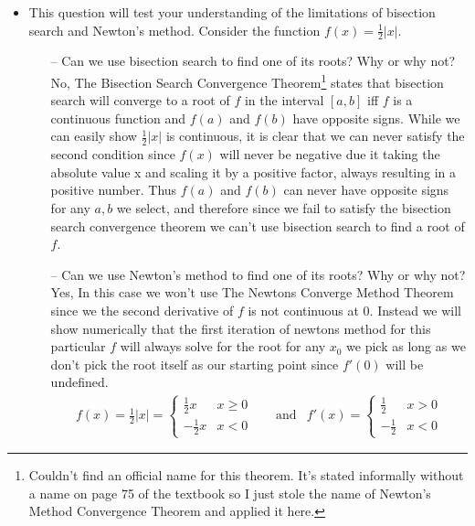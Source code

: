 \documentclass{article}
\begin{document}
\begin{itemize}
    \newpage
    \item This question will test your understanding of the limitations of bisection search and Newton’s method. Consider the function $f(x) = \frac{1}{2}|x|$.
    \begin{itemize}
        \item[--] Can we use bisection search to find one of its roots? Why or why not?
        \newline\newline
        No, The Bisection Search Convergence Theorem\footnote{Couldn't find an official name  for this theorem. It's stated informally without a name on page 75 of the textbook so I just stole the name of Newton's Method Convergence Theorem and applied it here.} states that bisection search will converge to a root of $f$ in the interval $[a, b]$ iff $f$ is a continuous function and $f(a)$ and $f(b)$ have opposite signs. While we can easily show $\frac{1}{2}|x|$ is continuous, it is clear that we can never satisfy the second condition since $f(x)$ will never be negative due it taking the absolute value x and scaling it by a positive factor, always resulting in a positive number. Thus $f(a)$ and $f(b)$ can never have opposite signs for any $a, b$ we select, and therefore since we fail to satisfy the bisection search convergence theorem we can't use bisection search to find a root of $f$.
        \newline\newline
        \item[--] Can we use Newton’s method to find one of its roots? Why or why not?
        \newline\newline
        Yes, In this case we won't use The Newtons Converge Method Theorem since we the second derivative of $f$ is not continuous at 0. Instead we will show numerically that the first iteration of newtons method for this particular $f$ will always solve for the root for any $x_0$ we pick as long as we don't pick the root itself as our starting point since $f'(0)$ will be undefined.
        \begin{equation}
        \begin{aligned}
            f(x) = \frac{1}{2}|x| = \begin{cases} \frac{1}{2}x & x \geq 0 \\ -\frac{1}{2}x & x<0 \end{cases} & \quad \textrm{and} & f'(x) = \begin{cases} \frac{1}{2} & x > 0 \\ -\frac{1}{2} & x<0 \end{cases}

\end{aligned}
\end{equation}
\end{itemize}
\end{itemize}
\end{document}
